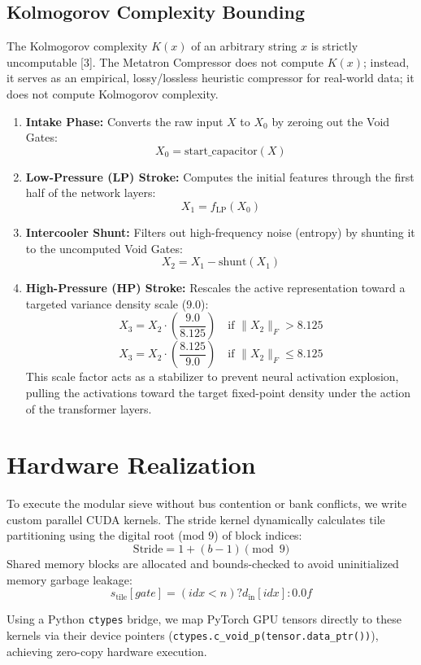 \documentclass[11pt,twocolumn]{article}
\begin{document}
\subsection{Kolmogorov Complexity Bounding}
The Kolmogorov complexity $K(x)$ of an arbitrary string $x$ is strictly uncomputable [3]. The Metatron Compressor does not compute $K(x)$; instead, it serves as an empirical, lossy/lossless heuristic compressor for real-world data; it does not compute Kolmogorov complexity.
\begin{enumerate}
    \item \textbf{Intake Phase:} Converts the raw input $X$ to $X_0$ by zeroing out the Void Gates:
    $$X_0 = \text{start\_capacitor}(X)$$
    \item \textbf{Low-Pressure (LP) Stroke:} Computes the initial features through the first half of the network layers:
    $$X_1 = f_{\text{LP}}(X_0)$$
    \item \textbf{Intercooler Shunt:} Filters out high-frequency noise (entropy) by shunting it to the uncomputed Void Gates:
    $$X_2 = X_1 - \text{shunt}(X_1)$$
    \item \textbf{High-Pressure (HP) Stroke:} Rescales the active representation toward a targeted variance density scale (9.0):
    $$X_3 = X_2 \cdot \left(\frac{9.0}{8.125}\right) \quad \text{if } \|X_2\|_F > 8.125$$
    $$X_3 = X_2 \cdot \left(\frac{8.125}{9.0}\right) \quad \text{if } \|X_2\|_F \le 8.125$$
    This scale factor acts as a stabilizer to prevent neural activation explosion, pulling the activations toward the target fixed-point density under the action of the transformer layers.
\end{enumerate}

\section{Hardware Realization}
To execute the modular sieve without bus contention or bank conflicts, we write custom parallel CUDA kernels. The stride kernel dynamically calculates tile partitioning using the digital root (mod 9) of block indices:
$$\text{Stride} = 1 + (b - 1) \pmod{9}$$
Shared memory blocks are allocated and bounds-checked to avoid uninitialized memory garbage leakage:
$$s_{\text{tile}}[gate] = (idx < n) ? d_{\text{in}}[idx] : 0.0f$$

Using a Python \texttt{ctypes} bridge, we map PyTorch GPU tensors directly to these kernels via their device pointers (\texttt{ctypes.c_void_p(tensor.data_ptr())}), achieving zero-copy hardware execution.
\end{document}
